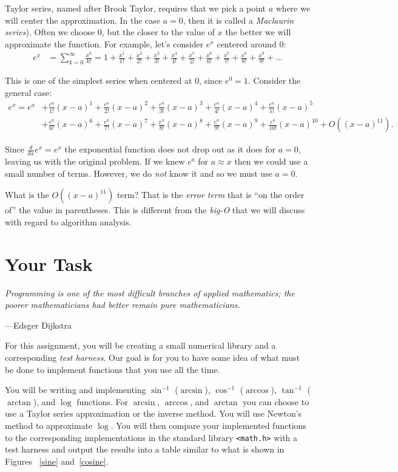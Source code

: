 \documentclass[11pt]{article}
\newcommand{\mlterm}[1]{\frac{x^{#1}}{#1!}}
\newcommand{\eterm}[1]{\frac{e^a}{#1!}{(x-a)}^{#1}}
\begin{document}
Taylor series, named after Brook Taylor, requires that we pick a point $a$ where
we will center the approximation. In the case $a =0$, then it is called a
\emph{Maclaurin series}).  Often we choose $0$, but the closer to the value of
$x$ the better we will approximate the function. For example, let's consider
$e^x$ centered around $0$:
\begin{align*}
  e^x & = \sum_{k=0}^{\infty} \frac{x^k}{k!} = 1 + \mlterm{1} + \mlterm{2} +
  \mlterm{3} + \mlterm{4} + \mlterm{5} + \mlterm{6} + \mlterm{7} + \mlterm{8} +
  \mlterm{9} + \ldots
\end{align*}

This is one of the simplest series when centered at $0$, since $e^0 = 1$.
Consider the general case:
\begin{align*}
  e^x = e^a &+ \eterm{1} + \eterm{2} + \eterm{3} + \eterm{4} + \eterm{5} \\
            &+ \eterm{6} + \eterm{7} + \eterm{8} + \eterm{9} + \eterm{10}
             + O({(x-a)}^{11}).
\end{align*}

Since $\frac{d}{dx}e^x=e^x$ the exponential function does not drop out as it
does for $a=0$, leaving us with the original problem. If we knew $e^a$ for $a
\approx x$ then we could use a small number of terms. However, we do \emph{not}
know it and so we must use $a=0$.

What is the $O\left((x-a)^{11}\right)$ term? That is the \emph{error term} that
is ``on the order of'' the value in parentheses. This is different from the
\emph{big-O} that we will discuss with regard to algorithm analysis.


\section{Your Task}

\epigraph{\emph{Programming is one of the most difficult branches of applied
mathematics; the poorer mathematicians had better remain pure
mathematicians.}}{---Edsger Dijkstra}

\noindent For this assignment, you will be creating a small numerical library
and a corresponding \emph{test harness}. Our goal is for you to have some idea of what
must be done to implement functions that you use all the time.

You will be writing and implementing $\sin^{-1}$ ($\arcsin$), $\cos^{-1}$ ($\arccos$), $\tan^{-1}$ ($\arctan$), and $\log$ functions.
For $\arcsin$, $\arccos$, and $\arctan$ you can choose to use a Taylor series approximation or the inverse method. You will use Newton's method to approximate $\log$. You will then compare your
implemented functions to the corresponding implementations in the standard
library \texttt{<math.h>} with a test harness and output the results into a
table similar to what is shown in Figures ~\ref{sine} and~\ref{cosine}.
\end{document}
